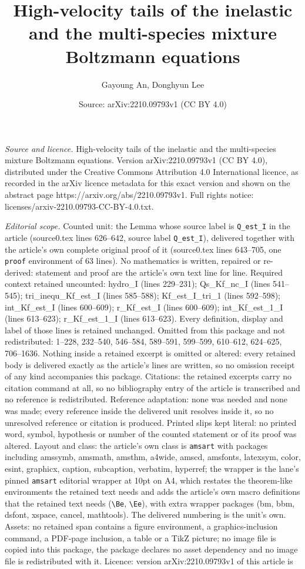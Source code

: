 \documentclass[10pt,a4paper]{amsart}
\title[High-velocity tails of the inelastic and the multi-species m]{High-velocity tails of the inelastic and the multi-species mixture Boltzmann equations}
\author{Gayoung An, Donghyun Lee}
\date{Source: arXiv:2210.09793v1 (CC BY 4.0)}
\begin{document}
\maketitle

\noindent\emph{Source and licence.} High-velocity tails of the inelastic and the multi-species mixture Boltzmann equations. Version arXiv:2210.09793v1 (CC BY 4.0), distributed under the Creative Commons Attribution 4.0 International licence, as recorded in the arXiv licence metadata for this exact version and shown on the abstract page https://arxiv.org/abs/2210.09793v1. Full rights notice: licenses/arxiv-2210.09793-CC-BY-4.0.txt.\par\smallskip

\noindent\textit{Editorial scope.} Counted unit: the Lemma whose source label is \texttt{Q\_est\_I} in the article (source0.tex lines 626--642, source label \texttt{Q\_est\_I}), delivered together with the article's own complete original proof of it (source0.tex lines 643--705, one \texttt{proof} environment of 63 lines). No mathematics is written, repaired or re-derived: statement and proof are the article's own text line for line. Required context retained uncounted: hydro\_I (lines 229--231); Qs\_Kf\_nc\_I (lines 541--545); tri\_inequ\_Kf\_est\_I (lines 585--588); Kf\_est\_I\_tri\_1 (lines 592--598); int\_Kf\_est\_I (lines 600--609); r\_Kf\_est\_I (lines 600--609); int\_Kf\_est\_1\_I (lines 613--623); r\_Kf\_est\_1\_I (lines 613--623). Every definition, display and label of those lines is retained unchanged. Omitted from this package and not redistributed: 1--228, 232--540, 546--584, 589--591, 599--599, 610--612, 624--625, 706--1636. Nothing inside a retained excerpt is omitted or altered: every retained body is delivered exactly as the article's lines are written, so no omission receipt of any kind accompanies this package. Citations: the retained excerpts carry no citation command at all, so no bibliography entry of the article is transcribed and no reference is redistributed. Reference adaptation: none was needed and none was made; every reference inside the delivered unit resolves inside it, so no unresolved reference or citation is produced. Printed slips kept literal: no printed word, symbol, hypothesis or number of the counted statement or of its proof was altered. Layout and class: the article's own class is \texttt{amsart} with packages including amssymb, amsmath, amsthm, a4wide, amscd, amsfonts, latexsym, color, esint, graphicx, caption, subcaption, verbatim, hyperref; the wrapper is the lane's pinned \texttt{amsart} editorial wrapper at 10pt on A4, which restates the theorem-like environments the retained text needs and adds the article's own macro definitions that the retained text needs (\texttt{\textbackslash Be}, \texttt{\textbackslash Ee}), with extra wrapper packages (bm, bbm, dsfont, xspace, cancel, mathtools). The delivered numbering is the unit's own. Assets: no retained span contains a figure environment, a graphics-inclusion command, a PDF-page inclusion, a table or a TikZ picture; no image file is copied into this package, the package declares no asset dependency and no image file is redistributed with it. Licence: version arXiv:2210.09793v1 of this article is 
\end{document}
